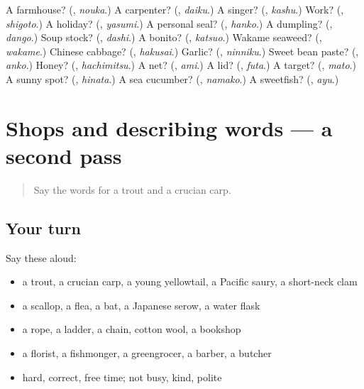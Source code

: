 \begin{tcolorbox}[breakable,colback=teal!4,colframe=teal!35!black,title={Before you move on}]
A farmhouse? (\textbf{}, \emph{nouka}.) A carpenter? (\textbf{}, \emph{daiku}.) A singer? (\textbf{}, \emph{kashu}.) Work? (\textbf{}, \emph{shigoto}.) A holiday? (\textbf{}, \emph{yasumi}.) A personal seal? (\textbf{}, \emph{hanko}.) A dumpling? (\textbf{}, \emph{dango}.) Soup stock? (\textbf{}, \emph{dashi}.) A bonito? (\textbf{}, \emph{katsuo}.) Wakame seaweed? (\textbf{}, \emph{wakame}.) Chinese cabbage? (\textbf{}, \emph{hakusai}.) Garlic? (\textbf{}, \emph{ninniku}.) Sweet bean paste? (\textbf{}, \emph{anko}.) Honey? (\textbf{}, \emph{hachimitsu}.) A net? (\textbf{}, \emph{ami}.) A lid? (\textbf{}, \emph{futa}.) A target? (\textbf{}, \emph{mato}.) A sunny spot? (\textbf{}, \emph{hinata}.) A sea cucumber? (\textbf{}, \emph{namako}.) A sweetfish? (\textbf{}, \emph{ayu}.)
\end{tcolorbox}
\section[(dialogue)]{Shops and describing words — a second pass}

\label{lesson:JA-R120-second-pass-shops-and-describing-words}



\begin{quote}
Say the words for a trout and a crucian carp.
\end{quote}

\subsection*{Your turn}
Say these aloud:

\begin{itemize}
\raggedright
  \item a trout, a crucian carp, a young yellowtail, a Pacific saury, a short-neck clam
  \item a scallop, a flea, a bat, a Japanese serow, a water flask
  \item a rope, a ladder, a chain, cotton wool, a bookshop
  \item a florist, a fishmonger, a greengrocer, a barber, a butcher
  \item hard, correct, free time; not busy, kind, polite
\end{itemize}

